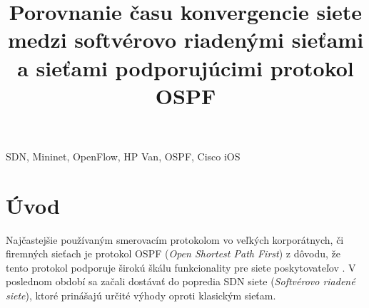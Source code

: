 \documentclass[conference]{IEEEtran}
\begin{document}
%
\title{Porovnanie času konvergencie siete medzi softvérovo riadenými sieťami a sieťami podporujúcimi protokol OSPF}

\author{
\and
{}
}




\maketitle

\begin{abstract}

\end{abstract}

\begin{IEEEkeywords}
SDN, Mininet, OpenFlow, HP Van, OSPF, Cisco iOS
\end{IEEEkeywords}

\IEEEpeerreviewmaketitle

\section{Úvod}

Najčastejšie používaným smerovacím protokolom vo veľkých korporátnych, či firemných sieťach je protokol OSPF (\textit{Open Shortest Path First}) z dôvodu, že tento protokol podporuje širokú škálu funkcionality pre siete poskytovateľov \cite{first}. V poslednom období sa začali dostávať do popredia SDN siete (\textit{Softvérovo riadené siete}), ktoré prinášajú určité výhody oproti klasickým sieťam.
\end{document}
